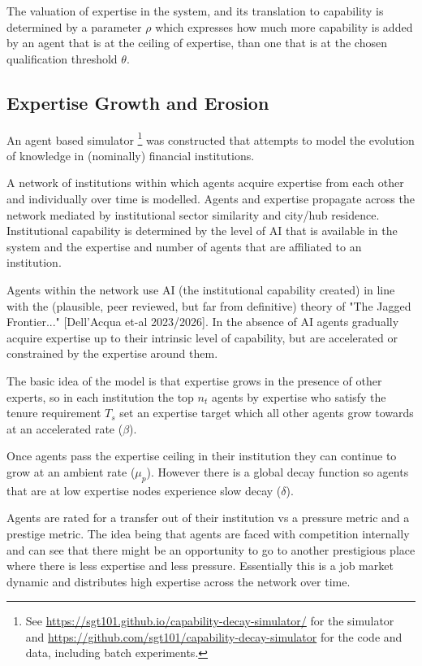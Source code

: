 \documentclass[11pt]{article}
\begin{document}
The valuation of expertise in the system, and its translation to capability is determined by a parameter $\rho$ which expresses how much more capability is added by an agent that is at the ceiling of expertise, than one that is at the chosen qualification threshold $\theta$. 

\subsection{Expertise Growth and Erosion}

An agent based simulator \footnote{See \url{https://sgt101.github.io/capability-decay-simulator/} for the simulator and \url{https://github.com/sgt101/capability-decay-simulator} for the code and data, including batch experiments.} was constructed that attempts to model the evolution of knowledge in (nominally) financial institutions. 

 A network of institutions within which agents acquire expertise from each other and individually over time is modelled. Agents and expertise propagate across the network mediated by institutional sector similarity and city/hub residence. Institutional capability is determined by the level of AI that is available in the system and the expertise and number of agents that are affiliated to an institution.

Agents within the network use AI (the institutional capability created) in line with the (plausible, peer reviewed, but far from definitive) theory of "The Jagged Frontier..." [Dell'Acqua et-al 2023/2026]. In the absence of AI agents gradually acquire expertise up to their intrinsic level of capability, but are accelerated or constrained by the expertise around them.

The basic idea of the model is that expertise grows in the presence of other experts, so in each institution the top $n_t$ agents by expertise who satisfy the tenure requirement $T_s$ set an expertise target which all other agents grow towards at an accelerated rate ($\beta$).

Once agents pass the expertise ceiling in their institution they can continue to grow at an ambient rate ($\mu_p$). However there is a global decay function so agents that are at low expertise nodes experience slow decay ($\delta$).

Agents are rated for a transfer out of their institution vs a pressure metric and a prestige metric. The idea being that agents are faced with competition internally and can see that there might be an opportunity to go to another prestigious place where there is less expertise and less pressure. Essentially this is a job market dynamic and distributes high expertise across the network over time.
\end{document}
